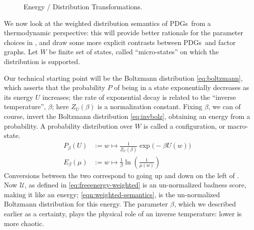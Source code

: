 \documentclass{article}
\newcommand{\MN}{PDG}
\newcommand{\MNs}{\MN s}
\numberwithin{equation}{section}
\begin{document}
\begin{notfocus}
\begin{figure}[t]
{}
		\caption{Energy / Distribution Transformations. 
		}
		\label{fig:energies-and-dists}
	\end{figure}
	We now look at the weighted distribution semantics of \MNs\ from a thermodynamic perspective: this will provide better rationale for the parameter choices in , and draw some more explicit contrasts between \MNs\ and factor graphs.	Let $W$ be finite set of states, called ``micro-states'' on which the distribution is supported.
	
	Our technical starting point will be the Boltzmann distribution \eqref{eq:boltzmann}, which asserts that the probability $P$ of being in a state exponentially decreases as its energy $U$ increases; the rate of exponential decay is related to the ``inverse temperature'', $\beta$; here $Z_U(\beta)$ is a normalization constant. Fixing $\beta$, we can of course, invert the Boltzmann distribution \eqref{eq:invbolz}, obtaining an energy from a probability. A probability distribution over $W$ is called a configuration, or macro-state.
 	\begin{align}
	 P_{\beta}(U) &:= w \mapsto  \frac{1}{Z_U(\beta)}\exp\Big(-\beta U(w)\Big) \label{eq:boltzmann} \\
 		E_{\beta}(\mu) &:= w \mapsto \frac{1}{\beta} \ln \left(\frac{1}{\mu(w)}\right) \label{eq:invbolz}
 	\end{align}
 	Conversions between the two correspond to going up and down on the left of . 
 	Now $\mathcal U$, as defined in \eqref{eq:freeenergy-weighted} is an un-normalized badness score, making it like an energy; \eqref{eqn:weighted-semantics}, is the un-normalized Boltzmann distribution for this energy. The parameter $\beta$, which we described earlier as a certainty, plays the physical role of an inverse temperature: lower is more chaotic. 
 	

\end{notfocus}
\end{document}
